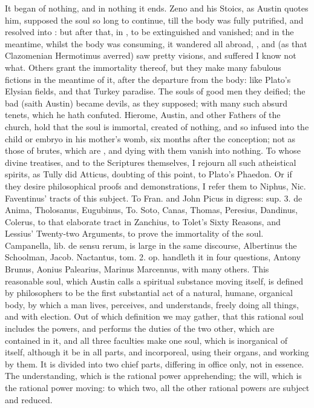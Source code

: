 {It began of nothing, and in nothing it ends. Zeno and his Stoics, as
Austin quotes him, supposed the soul so long to continue, till
the body was fully putrified, and resolved into : but
after that, in , to be extinguished and vanished; and
in the meantime, whilst the body was consuming, it wandered all abroad,
, and (as that Clazomenian Hermotimus
averred) saw pretty visions, and suffered I know not what. 
Others grant the immortality thereof, but they make many fabulous
fictions in the meantime of it, after the departure from the body: like
Plato's Elysian fields, and that Turkey paradise. The souls of good men
they deified; the bad (saith Austin) became devils, as they
supposed; with many such absurd tenets, which he hath confuted.
Hierome, Austin, and other Fathers of the church, hold that the soul is
immortal, created of nothing, and so infused into the child or embryo
in his mother's womb, six months after the conception; not as
those of brutes, which are , and dying with them vanish into
nothing. To whose divine treatises, and to the Scriptures themselves, I
rejourn all such atheistical spirits, as Tully did Atticus, doubting of
this point, to Plato's Phaedon. Or if they desire philosophical proofs
and demonstrations, I refer them to Niphus, Nic. Faventinus' tracts of
this subject. To Fran. and John Picus in digress: sup. 3. de Anima,
Tholosanus, Eugubinus, To. Soto, Canas, Thomas, Peresius, Dandinus,
Colerus, to that elaborate tract in Zanchius, to Tolet's Sixty Reasons,
and Lessius' Twenty-two Arguments, to prove the immortality of the
soul. Campanella, lib. de sensu rerum, is large in the same discourse,
Albertinus the Schoolman, Jacob. Nactantus, tom. 2. op. handleth it in
four questions, Antony Brunus, Aonius Palearius, Marinus Marcennus,
with many others. This reasonable soul, which Austin calls a spiritual
substance moving itself, is defined by philosophers to be the first
substantial act of a natural, humane, organical body, by which a man
lives, perceives, and understands, freely doing all things, and with
election. Out of which definition we may gather, that this rational
soul includes the powers, and performs the duties of the two other,
which are contained in it, and all three faculties make one soul, which
is inorganical of itself, although it be in all parts, and incorporeal,
using their organs, and working by them. It is divided into two chief
parts, differing in office only, not in essence. The understanding,
which is the rational power apprehending; the will, which is the
rational power moving: to which two, all the other rational powers are
subject and reduced.

}
